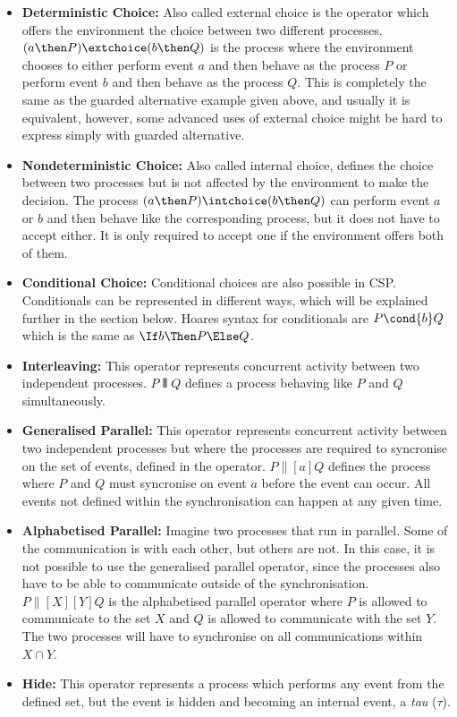 \begin{itemize}
    \item \textbf{Deterministic Choice:} Also called external choice is the operator which offers the environment the choice between two different processes. $(a \then P) \extchoice (b \then Q)$ is the process where the environment chooses to either perform event $a$ and then behave as the process $P$ or perform event $b$ and then behave as the process $Q$. This is completely the same as the guarded alternative example given above, and usually it is equivalent, however, some advanced uses of external choice might be hard to express simply with guarded alternative.
    \item \textbf{Nondeterministic Choice:} Also called internal choice, defines the choice between two processes but is not affected by the environment to make the decision.
    The process $(a \then P) \intchoice (b \then Q)$ can perform event $a$ or $b$ and then behave like the corresponding process, but it does not have to accept either. It is only required to accept one if the environment offers both of them.
    \item \textbf{Conditional Choice:} Conditional choices are also possible in CSP. Conditionals can be represented in different ways, which will be explained further in the \cspm{} section below. Hoares syntax for conditionals are $P \cond{b} Q$ which is the same as $\If b \Then P \Else Q$.
    \item \textbf{Interleaving:} This operator represents concurrent activity between two independent processes. $P  \interleave  Q$ defines a process behaving like $P$ and $Q$ simultaneously.
    \item \textbf{Generalised Parallel:} This operator represents concurrent activity between two independent processes but where the processes are required to syncronise on the set of events, defined in the operator. $ P  \parallel[a]  Q$ defines the process where $P$ and $Q$ must syncronise on event $a$ before the event can occur. All events not defined within the synchronisation can happen at any given time.
    \item \textbf{Alphabetised Parallel:} Imagine two processes that run in parallel. Some of the communication is with each other, but others are not. In this case, it is not possible to use the generalised parallel operator, since the processes also have to be able to communicate outside of the synchronisation. $P \parallel[X][Y] Q$ is the alphabetised parallel operator where $P$ is allowed to communicate to the set $X$ and $Q$ is allowed to communicate with the set $Y$. The two processes will have to synchronise on all communications within $X \cap Y$.
    \item \textbf{Hide:} This operator represents a process which performs any event from the defined set, but the event is hidden and becoming an internal event, a \textit{tau} ($\tau$).
\end{itemize}

